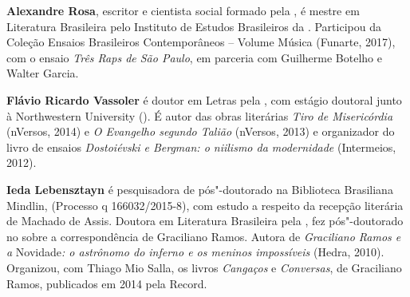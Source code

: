 

\textbf{Alexandre Rosa}, escritor e
  cientista social formado pela , é mestre em Literatura
  Brasileira pelo Instituto de Estudos Brasileiros da . Participou da
  Coleção Ensaios Brasileiros Contemporâneos -- Volume Música (Funarte,
  2017), com o ensaio \emph{Três Raps de São Paulo}, em parceria com
  Guilherme Botelho e Walter Garcia.

\textbf{Flávio Ricardo Vassoler} é doutor em Letras pela , com estágio doutoral junto à
  Northwestern University (). É autor das obras literárias \emph{Tiro
  de Misericórdia} (nVersos, 2014) e \emph{O Evangelho segundo Talião}
  (nVersos, 2013) e organizador do livro de ensaios \emph{Dostoiévski e
  Bergman: o niilismo da modernidade} (Intermeios, 2012).

\textbf{Ieda Lebensztayn} é
  pesquisadora de pós"-doutorado na Biblioteca Brasiliana Mindlin,
   (Processo q 166032/2015-8), com estudo a
  respeito da recepção literária de Machado de Assis. Doutora em
  Literatura Brasileira pela , fez pós"-doutorado no 
  sobre a correspondência de Graciliano Ramos. Autora de
  \emph{Graciliano Ramos e a} Novidade\emph{: o astrônomo do inferno e
  os meninos impossíveis} (Hedra, 2010). Organizou, com Thiago Mio
  Salla, os livros \emph{Cangaços} e \emph{Conversas}, de Graciliano
  Ramos, publicados em 2014 pela Record.





